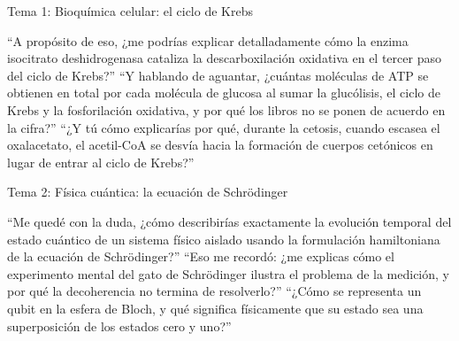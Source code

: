 \begin{frame}{Tema 1: Bioquímica celular: el ciclo de Krebs}
  \footnotesize
  \begin{enumerate}
    \setlength{\itemsep}{0.12cm}
      {\enquote{A propósito de eso, ¿me podrías explicar detalladamente cómo la enzima isocitrato deshidrogenasa cataliza la descarboxilación oxidativa en el tercer paso del ciclo de Krebs?}}
      {\enquote{Y hablando de aguantar, ¿cuántas moléculas de ATP se obtienen en total por cada molécula de glucosa al sumar la glucólisis, el ciclo de Krebs y la fosforilación oxidativa, y por qué los libros no se ponen de acuerdo en la cifra?}}
      {\enquote{¿Y tú cómo explicarías por qué, durante la cetosis, cuando escasea el oxalacetato, el acetil-CoA se desvía hacia la formación de cuerpos cetónicos en lugar de entrar al ciclo de Krebs?}}
  \end{enumerate}
\end{frame}

\begin{frame}{Tema 2: Física cuántica: la ecuación de Schrödinger}
  \footnotesize
  \begin{enumerate}
    \setlength{\itemsep}{0.12cm}
      {\enquote{Me quedé con la duda, ¿cómo describirías exactamente la evolución temporal del estado cuántico de un sistema físico aislado usando la formulación hamiltoniana de la ecuación de Schrödinger?}}
      {\enquote{Eso me recordó: ¿me explicas cómo el experimento mental del gato de Schrödinger ilustra el problema de la medición, y por qué la decoherencia no termina de resolverlo?}}
      {\enquote{¿Cómo se representa un qubit en la esfera de Bloch, y qué significa físicamente que su estado sea una superposición de los estados cero y uno?}}
  \end{enumerate}
\end{frame}

